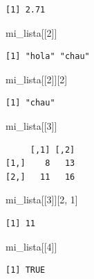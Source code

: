 \documentclass[
]{book}
\newenvironment{Shaded}{\begin{snugshade}}{\end{snugshade}}
\newcommand{\DecValTok}[1]{\textcolor[rgb]{0.00,0.00,0.81}{#1}}
\newcommand{\NormalTok}[1]{#1}
\begin{document}
\begin{verbatim}
[1] 2.71
\end{verbatim}

\begin{Shaded}
\begin{Highlighting}[]
\NormalTok{mi\_lista[[}\DecValTok{2}\NormalTok{]]}
\end{Highlighting}
\end{Shaded}

\begin{verbatim}
[1] "hola" "chau"
\end{verbatim}

\begin{Shaded}
\begin{Highlighting}[]
\NormalTok{mi\_lista[[}\DecValTok{2}\NormalTok{]][}\DecValTok{2}\NormalTok{]}
\end{Highlighting}
\end{Shaded}

\begin{verbatim}
[1] "chau"
\end{verbatim}

\begin{Shaded}
\begin{Highlighting}[]
\NormalTok{mi\_lista[[}\DecValTok{3}\NormalTok{]]}
\end{Highlighting}
\end{Shaded}

\begin{verbatim}
     [,1] [,2]
[1,]    8   13
[2,]   11   16
\end{verbatim}

\begin{Shaded}
\begin{Highlighting}[]
\NormalTok{mi\_lista[[}\DecValTok{3}\NormalTok{]][}\DecValTok{2}\NormalTok{, }\DecValTok{1}\NormalTok{]}
\end{Highlighting}
\end{Shaded}

\begin{verbatim}
[1] 11
\end{verbatim}

\begin{Shaded}
\begin{Highlighting}[]
\NormalTok{mi\_lista[[}\DecValTok{4}\NormalTok{]]}
\end{Highlighting}
\end{Shaded}

\begin{verbatim}
[1] TRUE
\end{verbatim}
\end{document}
